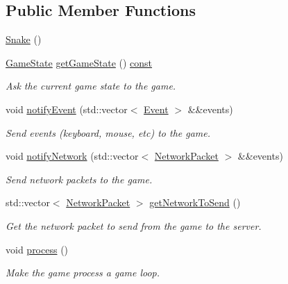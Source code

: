 \subsection*{Public Member Functions}
\begin{DoxyCompactItemize}
\item 
\hyperlink{classarcade_1_1_snake_ac2d67bc373332c9c8dc52743efc052ce}{Snake} ()
\item 
\hyperlink{namespacearcade_a6adca89ee2f539b03980c7e59b044ed7}{Game\-State} \hyperlink{classarcade_1_1_snake_ab2d6014b46d2718b56a889a4304e53f8}{get\-Game\-State} () \hyperlink{term__entry_8h_a57bd63ce7f9a353488880e3de6692d5a}{const} 
\begin{DoxyCompactList}\small\item\em Ask the current game state to the game. \end{DoxyCompactList}\item 
void \hyperlink{classarcade_1_1_snake_a67c84e134b4c6cbbfea804614861d80c}{notify\-Event} (std\-::vector$<$ \hyperlink{structarcade_1_1_event}{Event} $>$ \&\&events)
\begin{DoxyCompactList}\small\item\em Send events (keyboard, mouse, etc) to the game. \end{DoxyCompactList}\item 
void \hyperlink{classarcade_1_1_snake_a0b9e6e56fedba0a464ec7b877e1583c3}{notify\-Network} (std\-::vector$<$ \hyperlink{structarcade_1_1_network_packet}{Network\-Packet} $>$ \&\&events)
\begin{DoxyCompactList}\small\item\em Send network packets to the game. \end{DoxyCompactList}\item 
std\-::vector$<$ \hyperlink{structarcade_1_1_network_packet}{Network\-Packet} $>$ \hyperlink{classarcade_1_1_snake_a3af87d366737c793cfde08549f632040}{get\-Network\-To\-Send} ()
\begin{DoxyCompactList}\small\item\em Get the network packet to send from the game to the server. \end{DoxyCompactList}\item 
void \hyperlink{classarcade_1_1_snake_a8dab081fc5961736237b7f909d87d845}{process} ()
\begin{DoxyCompactList}\small\item\em Make the game process a game loop. \end{DoxyCompactList}\item 

\end{DoxyCompactItemize}

